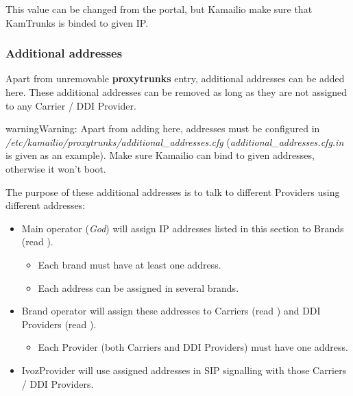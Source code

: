 \documentclass[letterpaper,10pt,english]{sphinxmanual}
\begin{document}
This value can be changed from the portal, but Kamailio make sure that KamTrunks is binded to given IP.


\subsubsection{Additional addresses}
\label{administration_portal/platform/infrastructure/proxy_trunks:additional-addresses}
Apart from unremovable \textbf{proxytrunks} entry, additional addresses can be added here. These additional addresses can be
removed as long as they are not assigned to any Carrier / DDI Provider.

\begin{notice}{warning}{Warning:}
Apart from adding here, addresses must be configured in \emph{/etc/kamailio/proxytrunks/additional\_addresses.cfg}
(\emph{additional\_addresses.cfg.in} is given as an example). Make sure Kamailio can bind to given addresses,
otherwise it won't boot.
\end{notice}

The purpose of these additional addresses is to talk to different Providers using different addresses:
\begin{itemize}
\item {} 
Main operator (\emph{God}) will assign IP addresses listed in this section to Brands (read {\hyperref[administration_portal/platform/brands:brands]{}}).
\begin{itemize}
\item {} 
Each brand must have at least one address.

\item {} 
Each address can be assigned in several brands.

\end{itemize}

\item {} 
Brand operator will assign these addresses to Carriers (read {\hyperref[administration_portal/brand/providers/carriers:carriers]{}}) and DDI Providers (read {\hyperref[administration_portal/brand/providers/ddi_providers:ddi\string-providers]{}}).
\begin{itemize}
\item {} 
Each Provider (both Carriers and DDI Providers) must have one address.

\end{itemize}

\item {} 
IvozProvider will use assigned addresses in SIP signalling with those Carriers / DDI Providers.

\end{itemize}
\end{document}
